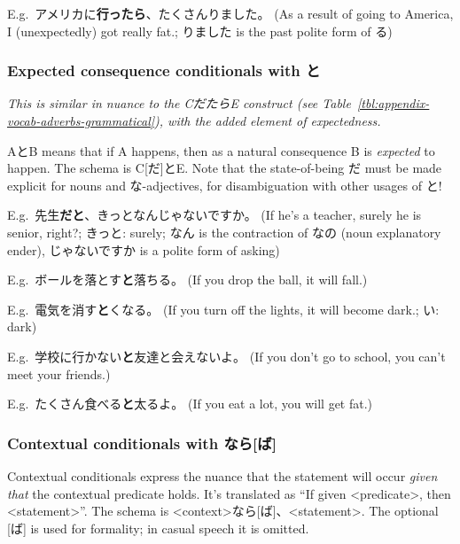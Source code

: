 \documentclass[../nihongo-gakushuu-kyouzai.tex]{subfiles}
\begin{document}
E.g.\ アメリカに\textbf{行ったら\textlightgrey{[ば]}}、たくさんりました。 (As a result of going to America, I (unexpectedly) got really fat.; りました is the past polite form of る)


\subsubsection{Expected consequence conditionals with と} \label{sec:expected-consequence-conditionals}
\emph{This is similar in nuance to the CだたらE construct (see Table~\ref{tbl:appendix-vocab-adverbs-grammatical}), with the added element of \emph{expectedness}.}

AとB means that if A happens, then as a natural consequence B is \emph{expected} to happen. The schema is C[だ]とE. Note that the state-of-being だ must be made explicit for nouns and な-adjectives, for disambiguation with other usages of と!

E.g.\ 先生\textbf{だと}、きっとなんじゃないですか。 (If he's a teacher, surely he is senior, right?; きっと: surely; なん is the contraction of なの (noun explanatory ender), じゃないですか is a polite form of asking)

E.g.\ ボールを落とす\textbf{と}落ちる。 (If you drop the ball, it will fall.)

E.g.\ 電気を消す\textbf{と}くなる。 (If you turn off the lights, it will become dark.; い: dark)

E.g.\ 学校に行かない\textbf{と}友達と会えないよ。 (If you don't go to school, you can't meet your friends.)

E.g.\ たくさん食べる\textbf{と}太るよ。 (If you eat a lot, you will get fat.)

\subsubsection{Contextual conditionals with なら[ば]} \label{sec:contextual-conditionals}
Contextual conditionals express the nuance that the statement will occur \emph{given that} the contextual predicate holds. It's translated as ``If given <predicate>, then <statement>''. The schema is <context>なら[ば]、<statement>. The optional [ば] is used for formality; in casual speech it is omitted.
\end{document}
